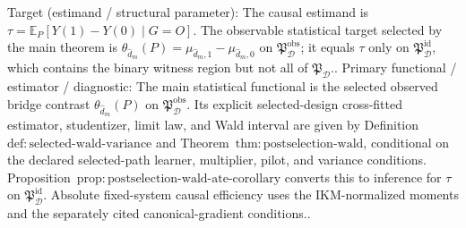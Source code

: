 \documentclass{article}
\begin{document}
Target (estimand / structural parameter): The causal estimand is \(\tau=\mathbb E_P[Y(1)-Y(0)\mid G=O]\). The observable statistical target selected by the main theorem is \(\theta_{\widehat d_m}(P)=\mu_{\widehat d_m,1}-\mu_{\widehat d_m,0}\) on \(\mathfrak P_{\mathcal D}^{\mathrm{obs}}\); it equals \(\tau\) only on \(\mathfrak P_{\mathcal D}^{\mathrm{id}}\), which contains the binary witness region but not all of \(\mathfrak P_{\mathcal D}\)..
Primary functional / estimator / diagnostic: The main statistical functional is the selected observed bridge contrast \(\theta_{\widehat d_m}(P)\) on \(\mathfrak P_{\mathcal D}^{\mathrm{obs}}\). Its explicit selected-design cross-fitted estimator, studentizer, limit law, and Wald interval are given by Definition~\(\mathrm{def{:}selected\text{-}wald\text{-}variance}\) and Theorem~\(\mathrm{thm{:}postselection\text{-}wald}\), conditional on the declared selected-path learner, multiplier, pilot, and variance conditions. Proposition~\(\mathrm{prop{:}postselection\text{-}wald\text{-}ate\text{-}corollary}\) converts this to inference for \(\tau\) on \(\mathfrak P_{\mathcal D}^{\mathrm{id}}\). Absolute fixed-system causal efficiency uses the IKM-normalized moments and the separately cited canonical-gradient conditions..
\end{document}
